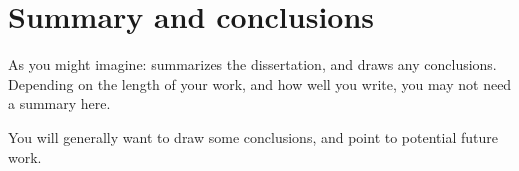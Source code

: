\chapter{Summary and conclusions}

As you might imagine: summarizes the dissertation, and draws any
conclusions. Depending on the length of your work, and how well you
write, you may not need a summary here.

You will generally want to draw some conclusions, and point to
potential future work.
